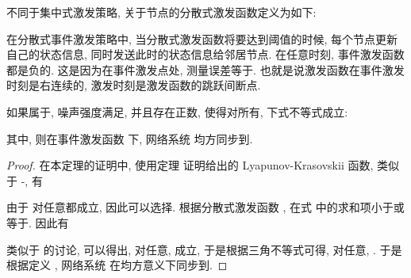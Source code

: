         不同于集中式激发策略, 关于节点的分散式激发函数定义为如下:
        \begin{comment}\label{detrig-f}
            g^i(t)=(1+\epsilon)\|\delta_i(t)\|^2+\epsilon\|\hat{s}_i(t)\|^2-\frac{\xi^2\underline{q}^2}{4(\bar{\lambda}^2+2\epsilon)c^2\bar{q}^2\bar{\gamma}^2}\|e_i(t)\|^2,
        \end{comment}
        \begin{rem}
            在分散式事件激发策略中, 当分散式激发函数将要达到阈值的时候, 每个节点更新自己的状态信息, 同时发送此时的状态信息给邻居节点. 在任意时刻, 事件激发函数 都是负的. 这是因为在事件激发点处, 测量误差等于. 也就是说激发函数在事件激发时刻是右连续的, 激发时刻是激发函数的跳跃间断点.
        \end{rem}
        \begin{thm}\label{thm:decen}
            如果属于, 噪声强度满足, 并且存在正数, 使得对所有, 下式不等式成立:
            \begin{comment}\label{de-condiction}
            \left\{
            \begin{commented}
                  &(\bar{\delta}+\chi_u)I_N-c\underline{\gamma}(L(u)+\epsilon D(u))\leq0,\\
                  &\pi_v-a_u\leq0, \quad \text{if},\quad v\neq u, v\in S^u_2,\\
                  &\pi_v-a_u\geq0, \quad \text{if}, \quad v= u, v\in S^u_2,
            \end{commented}
            \right.
            \end{comment}
        其中, 则在事件激发函数  下, 网络系统  均方同步到.
        \end{thm}
        \begin{proof}
        在本定理的证明中, 使用定理  证明给出的 Lyapunov-Krasovskii 函数, 类似于 -, 有
        \begin{comment}\label{deEdVt}
        \nonumber \frac{dEV(t)}{dt}\leq&-\xi EV(t)+\frac{1}{2}\pi_uc^2Nqh(t)+\frac{\pi_u}{2}[-\xi\underline{q}+(\bar{\lambda}^2
        +2\epsilon)c\bar{q}^2\bar{\gamma}^2\mu]e^\top(t)e(t)\\
        \nonumber&+\frac{\pi_u}{2\mu}c[(1+\epsilon)\delta^\top(t)\delta(t)+\epsilon\hat{s}^\top(t)\hat{s}(t)]\\
        \nonumber=&-\xi EV(t)+\frac{1}{2}\pi_uc^2Nqh(t)+\frac{\pi_u}{2}\sum_{i=1}^N\bigg\{[-\xi\underline{q}+(\bar{\lambda}^2
        +2\epsilon)c\bar{q}^2\bar{\gamma}^2\mu]e_i^\top(t)e_i(t)\\
        &+\frac{c}{\mu}[(1+\epsilon)\delta_i^\top(t)\delta_i(t)+\epsilon\hat{s}_i^\top(t)\hat{s}_i(t)]\bigg\}.
        \end{comment}

        由于  对任意都成立, 因此可以选择. 根据分散式激发函数 , 在式  中的求和项小于或等于. 因此有
        \begin{comment}
            \frac{dEV(t)}{dt}\leq-\xi EV(t)+\frac{1}{2}\pi_uc^2Nqh(t).
        \end{comment}

        类似于  的讨论, 可以得出, 对任意, 成立, 于是根据三角不等式可得, 对任意, . 于是根据定义 , 网络系统  在均方意义下同步到.
        \end{proof}

